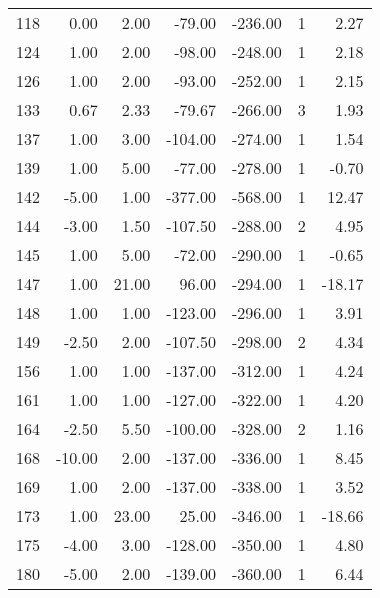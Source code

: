 \begin{appendices}
\begin{longtable}[c]{@{}rrrrrrr@{}}
118 & 0.00 & 2.00 & -79.00 & -236.00 & 1 & 2.27 \\

124 & 1.00 & 2.00 & -98.00 & -248.00 & 1 & 2.18 \\

126 & 1.00 & 2.00 & -93.00 & -252.00 & 1 & 2.15 \\

133 & 0.67 & 2.33 & -79.67 & -266.00 & 3 & 1.93 \\

137 & 1.00 & 3.00 & -104.00 & -274.00 & 1 & 1.54 \\

139 & 1.00 & 5.00 & -77.00 & -278.00 & 1 & -0.70 \\

142 & -5.00 & 1.00 & -377.00 & -568.00 & 1 & 12.47 \\

144 & -3.00 & 1.50 & -107.50 & -288.00 & 2 & 4.95 \\

145 & 1.00 & 5.00 & -72.00 & -290.00 & 1 & -0.65 \\

147 & 1.00 & 21.00 & 96.00 & -294.00 & 1 & -18.17 \\

148 & 1.00 & 1.00 & -123.00 & -296.00 & 1 & 3.91 \\

149 & -2.50 & 2.00 & -107.50 & -298.00 & 2 & 4.34 \\

156 & 1.00 & 1.00 & -137.00 & -312.00 & 1 & 4.24 \\

161 & 1.00 & 1.00 & -127.00 & -322.00 & 1 & 4.20 \\

164 & -2.50 & 5.50 & -100.00 & -328.00 & 2 & 1.16 \\

168 & -10.00 & 2.00 & -137.00 & -336.00 & 1 & 8.45 \\

169 & 1.00 & 2.00 & -137.00 & -338.00 & 1 & 3.52 \\

173 & 1.00 & 23.00 & 25.00 & -346.00 & 1 & -18.66 \\

175 & -4.00 & 3.00 & -128.00 & -350.00 & 1 & 4.80 \\

180 & -5.00 & 2.00 & -139.00 & -360.00 & 1 & 6.44 \\


\end{longtable}
\end{appendices}
